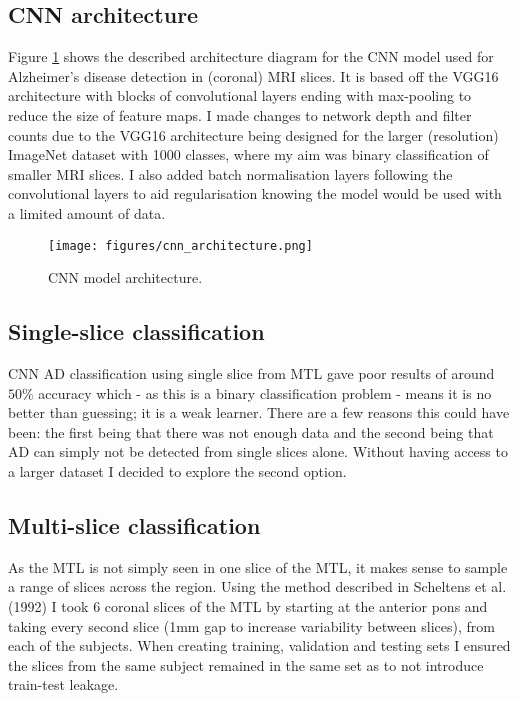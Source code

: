 \documentclass[
    author={Kai Hulme},
    supervisor={Dr Jon Bird},
    degree={BSc},
    title={Generative Adversarial Networks as an Augmentation Technique},
    subtitle={for Alzheimer's Disease Detection in MRI Volumes},
    type={Research},
    year={2021} 
]{dissertation}
\begin{document}
\subsection{CNN architecture}

Figure \ref{cnn_architecture} shows the described architecture diagram for the CNN model used for Alzheimer's disease detection in (coronal) MRI slices. It is based off the VGG16 architecture with blocks of convolutional layers ending with max-pooling to reduce the size of feature maps. I made changes to network depth and filter counts due to the VGG16 architecture being designed for the larger (resolution) ImageNet dataset with 1000 classes, where my aim was binary classification of smaller MRI slices. I also added batch normalisation layers following the convolutional layers to aid regularisation knowing the model would be used with a limited amount of data. 

\begin{figure}[t]
    \centering
    \texttt{[image: figures/cnn\_architecture.png]}
    \caption{CNN model architecture.}
    \label{cnn_architecture}
\end{figure}
	
\subsection{Single-slice classification}
	
CNN AD classification using single slice from MTL gave poor results of around $50\%$ accuracy which - as this is a binary classification problem - means it is no better than guessing; it is a weak learner. There are a few reasons this could have been: the first being that there was not enough data and the second being that AD can simply not be detected from single slices alone. Without having access to a larger dataset I decided to explore the second option.
	
\subsection{Multi-slice classification}
	
As the MTL is not simply seen in one slice of the MTL, it makes sense to sample a range of slices across the region. Using the method described in Scheltens et al. (1992) \cite{scheltens1992atrophy} I took 6 coronal slices of the MTL by starting at the anterior pons and taking every second slice (1mm gap to increase variability between slices), from each of the subjects. When creating training, validation and testing sets I ensured the slices from the same subject remained in the same set as to not introduce train-test leakage. \\
	
\end{document}
